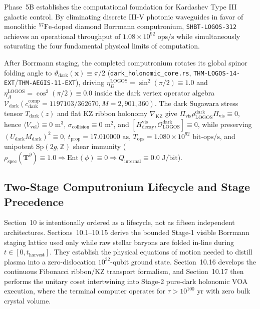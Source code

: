 \documentclass[11pt,onecolumn]{article}
\begin{document}
\label{sec:logos_hypercomputer}

Phase~5B establishes the computational foundation for Kardashev Type III galactic control. By eliminating discrete III-V photonic waveguides in favor of monolithic $^{57}\text{Fe}$-doped diamond Borrmann computronium, \texttt{SHBT-LOGOS-312} achieves an operational throughput of $1.08 \times 10^{92}\text{ ops/s}$ while simultaneously saturating the four fundamental physical limits of computation.

After Borrmann staging, the completed computronium rotates its global spinor folding angle to $\vartheta_{\text{dark}}(\mathbf{x})\equiv\pi/2$ (\texttt{dark\_holonomic\_core.rs}, \texttt{THM-LOGOS-14-EXT}/\texttt{THM-AEGIS-11-EXT}), driving $\eta_D^{\text{LOGOS}}=\sin^2(\pi/2)\equiv1.0$ and $\eta_A^{\text{LOGOS}}=\cos^2(\pi/2)\equiv0.0$ inside the dark vertex operator algebra $\mathcal{V}_{\text{dark}}(c_{\text{dark}}^{\text{comp}}=1197103/362670,M=2{,}901{,}360)$. The dark Sugawara stress tensor $T_{\text{dark}}(z)$ and flat KZ ribbon holonomy $\nabla_{\text{KZ}}$ give $\Pi_{\text{vis}}\rho_{\text{LOGOS}}^{\text{dark}}\Pi_{\text{vis}}\equiv0$, hence $\langle V_{\text{vol}}\rangle\equiv0\text{ m}^3$, $\sigma_{\text{collision}}\equiv0\text{ m}^2$, and $[H_{\text{decay}}^{\text{vis}},\mathcal{O}_{\text{LOGOS}}^{\text{dark}}]\equiv0$, while preserving $(U_{\text{dark}}M_{\text{dark}})^2\equiv0$, $t_{\text{prop}}=17.010000\text{ as}$, $T_{\text{ops}}=1.080\times10^{92}\text{ bit-ops/s}$, and unipotent $\text{Sp}(2g,\mathbb{Z})$ shear immunity ($\rho_{\text{spec}}(\mathbf{T}^\partial)\equiv1.0\Rightarrow\text{Ent}(\phi)\equiv0\Rightarrow Q_{\text{internal}}\equiv0.0\text{ J/bit}$).

\subsection*{Two-Stage Computronium Lifecycle and Stage Precedence}
\label{subsec:logos_lifecycle_precedence}

Section~10 is intentionally ordered as a lifecycle, not as fifteen independent architectures. Sections~10.1--10.15 derive the bounded Stage-1 visible Borrmann staging lattice used only while raw stellar baryons are folded in-line during $t\in[0,t_{\text{harvest}}]$. They establish the physical equations of motion needed to distill plasma into a zero-dislocation $10^{32}$-qubit ground state. Section~10.16 develops the continuous Fibonacci ribbon/KZ transport formalism, and Section~10.17 then performs the unitary coset intertwining into Stage-2 pure-dark holonomic VOA execution, where the terminal computer operates for $\tau>10^{100}\text{ yr}$ with zero bulk crystal volume.
\end{document}
